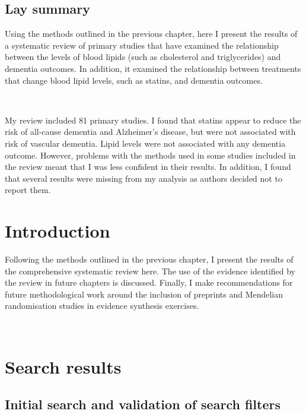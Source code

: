 \documentclass[a4paper, twoside]{templates/ociamthesis}
\begin{document}
\begin{laybox}

\hypertarget{lay-summary-3}{%
\section*{Lay summary}\label{lay-summary-3}}

Using the methods outlined in the previous chapter, here I present the results of a systematic review of primary studies that have examined the relationship between the levels of blood lipids (such as cholesterol and triglycerides) and dementia outcomes. In addition, it examined the relationship between treatments that change blood lipid levels, such as statins, and dementia outcomes.

~

My review included 81 primary studies. I found that statins appear to reduce the risk of all-cause dementia and Alzheimer's disease, but were not associated with risk of vascular dementia. Lipid levels were not associated with any dementia outcome. However, problems with the methods used in some studies included in the review meant that I was less confident in their results. In addition, I found that several results were missing from my analysis as authors decided not to report them.

\end{laybox}

\hypertarget{introduction-1}{%
\section{Introduction}\label{introduction-1}}

Following the methods outlined in the previous chapter, I present the results of the comprehensive systematic review here. The use of the evidence identified by the review in future chapters is discussed. Finally, I make recommendations for future methodological work around the inclusion of preprints and Mendelian randomisation studies in evidence synthesis exercises.

~

\hypertarget{search-results}{%
\section{Search results}\label{search-results}}

\hypertarget{initial-search-and-validation-of-search-filters}{%
\subsection{Initial search and validation of search filters}\label{initial-search-and-validation-of-search-filters}}
\end{document}
